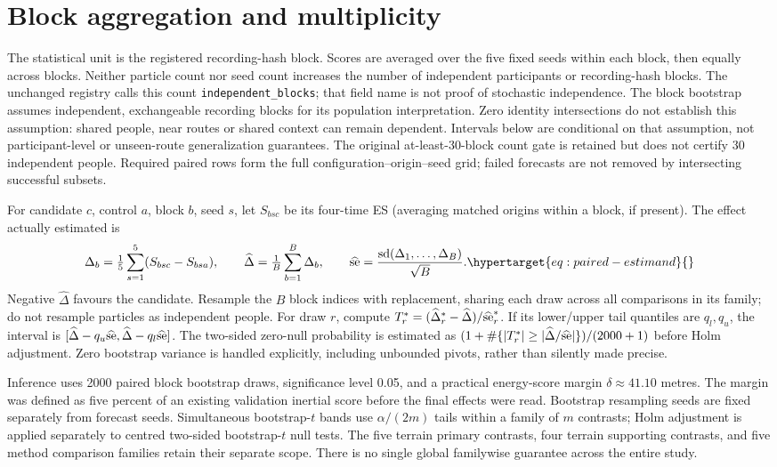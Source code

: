 \section{Block aggregation and multiplicity}
The statistical unit is the registered recording-hash block. Scores are averaged
over the five fixed seeds within each block, then equally across blocks.
Neither particle count nor seed count increases the number of independent
participants or recording-hash blocks. The unchanged registry calls this
count \texttt{independent\_blocks}; that field name is not proof of stochastic
independence. The block bootstrap assumes independent, exchangeable
recording blocks for its population interpretation. Zero identity intersections
do not establish this assumption: shared people, near routes or shared context
can remain dependent. Intervals below are conditional on that assumption,
not participant-level or unseen-route generalization guarantees. The original
at-least-30-block count gate is retained but does not certify 30 independent
people. Required paired rows form the full configuration--origin--seed grid;
failed forecasts are not removed by intersecting successful subsets.

For candidate \(c\), control \(a\), block \(b\), seed \(s\), let
\(S_{bsc}\) be its four-time ES (averaging matched origins within a block,
if present). The effect actually estimated is
\begin{equation}
 \Delta_b=\tfrac15\sum_{s=1}^5(S_{bsc}-S_{bsa}),\qquad
 \widehat\Delta=\tfrac1{B}\sum_{b=1}^{B}\Delta_b,\qquad
 \widehat{\rm se}=\frac{{\rm sd}(\Delta_1,\ldots,\Delta_B)}{\sqrt B}.
 \label{eq:paired-estimand}\hypertarget{eq:paired-estimand}{}
\end{equation}
Negative \(\widehat\Delta\) favours the candidate. Resample the \(B\) block
indices with replacement, sharing each draw across all comparisons in its
family; do not resample particles as independent people.
For draw \(r\), compute \(T_r^*=(\widehat\Delta_r^*-\widehat\Delta)/
\widehat{\rm se}_r^*\). If its lower/upper tail quantiles are \(q_l,q_u\),
the interval is
\([\widehat\Delta-q_u\widehat{\rm se},\widehat\Delta-q_l\widehat{\rm se}]\).
The two-sided zero-null probability is estimated as
\((1+\#\{|T_r^*|\geq|\widehat\Delta/\widehat{\rm se}|\})/(2000+1)\)
before Holm adjustment. Zero bootstrap variance is handled explicitly,
including unbounded pivots, rather than silently made precise.

Inference uses 2000 paired block bootstrap draws, significance level 0.05,
and a practical energy-score margin \(\delta\approx41.10\) metres. The margin
was defined as five percent of an existing validation inertial score before
the final effects were read. Bootstrap resampling seeds are fixed separately
from forecast seeds. Simultaneous bootstrap-\(t\) bands use
\(\alpha/(2m)\) tails within a family of \(m\) contrasts; Holm adjustment
is applied separately to centred two-sided bootstrap-\(t\) null tests.
The five terrain primary contrasts, four terrain supporting contrasts, and
five method comparison families retain their separate scope. There is no
single global familywise guarantee across the entire study.

